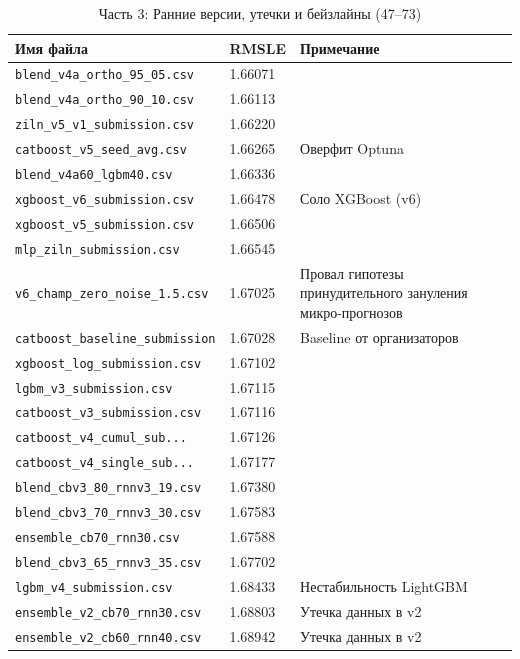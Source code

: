 \documentclass[12pt, a4paper]{article}
\begin{document}
	\begin{table}[H]
		\centering\small
		\caption{Часть 3: Ранние версии, утечки и бейзлайны (47–73)}
		\vspace{0.2cm}
		\begin{tabular}{l l p{7cm}}
			\toprule
			\textbf{Имя файла} & \textbf{RMSLE} & \textbf{Примечание} \\
			\midrule
			\texttt{blend\_v4a\_ortho\_95\_05.csv} & 1.66071 & \\
			\texttt{blend\_v4a\_ortho\_90\_10.csv} & 1.66113 & \\
			\texttt{ziln\_v5\_v1\_submission.csv} & 1.66220 & \\
			\texttt{catboost\_v5\_seed\_avg.csv} & 1.66265 & Оверфит Optuna \\
			\texttt{blend\_v4a60\_lgbm40.csv} & 1.66336 & \\
			\texttt{xgboost\_v6\_submission.csv} & 1.66478 & Соло XGBoost (v6) \\
			\texttt{xgboost\_v5\_submission.csv} & 1.66506 & \\
			\texttt{mlp\_ziln\_submission.csv} & 1.66545 & \\
			\texttt{v6\_champ\_zero\_noise\_1.5.csv} & 1.67025 & Провал гипотезы принудительного зануления микро-прогнозов \\
			\texttt{catboost\_baseline\_submission} & 1.67028 & Baseline от организаторов \\
			\texttt{xgboost\_log\_submission.csv} & 1.67102 & \\
			\texttt{lgbm\_v3\_submission.csv} & 1.67115 & \\
			\texttt{catboost\_v3\_submission.csv} & 1.67116 & \\
			\texttt{catboost\_v4\_cumul\_sub...} & 1.67126 & \\
			\texttt{catboost\_v4\_single\_sub...} & 1.67177 & \\
			\texttt{blend\_cbv3\_80\_rnnv3\_19.csv} & 1.67380 & \\
			\texttt{blend\_cbv3\_70\_rnnv3\_30.csv} & 1.67583 & \\
			\texttt{ensemble\_cb70\_rnn30.csv} & 1.67588 & \\
			\texttt{blend\_cbv3\_65\_rnnv3\_35.csv} & 1.67702 & \\
			\texttt{lgbm\_v4\_submission.csv} & 1.68433 & Нестабильность LightGBM \\
			\texttt{ensemble\_v2\_cb70\_rnn30.csv} & 1.68803 & Утечка данных в v2 \\
			\texttt{ensemble\_v2\_cb60\_rnn40.csv} & 1.68942 & Утечка данных в v2 \\

\end{tabular}
\end{table}
\end{document}

